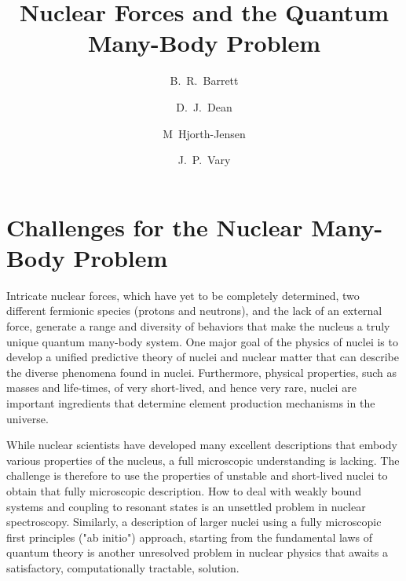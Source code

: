 \documentclass[12pt]{iopart}
\begin{document}
\title{Nuclear Forces and the Quantum Many-Body Problem} 


\author{B.~R.~Barrett}
\address{Department of Physics, PO Box 210081, University of Arizona, Tucson, 
         Arizona 85721, USA}


\author{D.~J.~Dean}
\address{Physics Division, Oak Ridge National Laboratory,
P.O. Box 2008, Oak Ridge, TN 37831-6373, USA\\
Center of Mathematics for Applications, 
University of Oslo,
N-0316 Oslo, Norway}


\author{M~Hjorth-Jensen}
\address{Department of Physics and Center of Mathematics for Applications, 
University of Oslo,
N-0316 Oslo, Norway\\
PH Division, CERN, CH-1211 Geneva 23, Switzerland\\
Department of Physics and Astronomy, Michigan State University,
East Lansing, MI 48824, USA}


\author{J.~P.~Vary}
\address{Department of Physics and Astronomy, Iowa State University, Ames, Iowa 50011, USA}


\maketitle
 
\section{Challenges for the Nuclear Many-Body Problem} 

Intricate nuclear forces, which
have yet to be completely determined, two different fermionic species 
(protons and neutrons), and the lack of an external force, generate a
range and diversity of behaviors that make the nucleus a truly unique 
quantum many-body system. One major goal of the physics of nuclei is to
develop a unified predictive theory of nuclei and nuclear matter 
that can describe the diverse phenomena found in nuclei. 
Furthermore, physical properties, such as masses and life-times,
of very short-lived, and hence very rare, nuclei are important
ingredients that determine element production mechanisms in
the universe. 

While nuclear scientists have developed many excellent descriptions
that embody various properties of the nucleus, a full microscopic
understanding is lacking. The challenge is therefore to use 
the properties of unstable and short-lived nuclei to obtain that
fully microscopic description. How to deal with weakly
bound systems and coupling to resonant states is an unsettled problem in
nuclear spectroscopy. Similarly,  a description of  larger nuclei using a
fully microscopic first principles ("ab initio") approach, starting from the
fundamental laws of quantum theory is another unresolved problem
in nuclear physics that awaits a satisfactory, computationally tractable,
solution.
\end{document}

